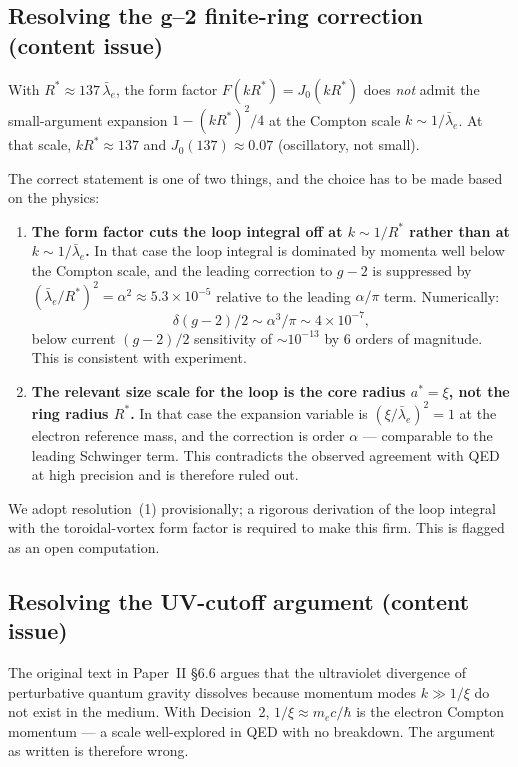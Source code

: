 \documentclass[11pt,a4paper]{article}
\begin{document}
\subsection{Resolving the g--2 finite-ring correction (content issue)}
\label{sec:g2}

With $R^* \approx 137\,\bar\lambda_e$, the form factor
$F(kR^*) = J_0(kR^*)$ does \emph{not} admit the small-argument expansion
$1 - (kR^*)^2/4$ at the Compton scale $k \sim 1/\bar\lambda_e$.  At that
scale, $kR^* \approx 137$ and $J_0(137) \approx 0.07$ (oscillatory, not
small).

The correct statement is one of two things, and the choice has to be made
based on the physics:

\begin{enumerate}
\item \textbf{The form factor cuts the loop integral off at $k \sim 1/R^*$
      rather than at $k \sim 1/\bar\lambda_e$.}  In that case the loop
      integral is dominated by momenta well below the Compton scale, and
      the leading correction to $g - 2$ is suppressed by
      $(\bar\lambda_e/R^*)^2 = \alpha^2 \approx 5.3\times 10^{-5}$ relative
      to the leading $\alpha/\pi$ term.  Numerically:
      \[
        \delta(g-2)/2 \sim \alpha^3/\pi \sim 4\times 10^{-7},
      \]
      below current $(g-2)/2$ sensitivity of $\sim 10^{-13}$ by 6 orders
      of magnitude.  This is consistent with experiment.
\item \textbf{The relevant size scale for the loop is the core radius
      $a^* = \xi$, not the ring radius $R^*$.}  In that case the
      expansion variable is $(\xi/\bar\lambda_e)^2 = 1$ at the electron
      reference mass, and the correction is order $\alpha$ --- comparable
      to the leading Schwinger term.  This contradicts the
      observed agreement with QED at high precision and is therefore
      ruled out.
\end{enumerate}

We adopt resolution~(1) provisionally; a rigorous derivation of the loop
integral with the toroidal-vortex form factor is required to make this
firm.  This is flagged as an open computation.

\subsection{Resolving the UV-cutoff argument (content issue)}

The original text in Paper~II \S6.6 argues that the ultraviolet
divergence of perturbative quantum gravity dissolves because momentum
modes $k \gg 1/\xi$ do not exist in the medium.  With Decision~2,
$1/\xi \approx m_e c/\hbar$ is the electron Compton momentum --- a scale
well-explored in QED with no breakdown.  The argument as written is
therefore wrong.
\end{document}
